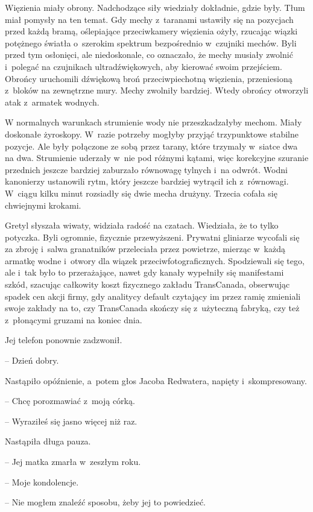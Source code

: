 \documentclass[oneside,polish,11pt,sfheadings]{mwbk}
\begin{document}
Więzienia miały obrony. Nadchodzące siły wiedziały dokładnie, gdzie
były. Tłum miał pomysły na ten temat. Gdy mechy z~taranami ustawiły się
na pozycjach przed każdą bramą, oślepiające przeciwkamery więzienia
ożyły, rzucając wiązki potężnego światła o~szerokim spektrum
bezpośrednio w~czujniki mechów. Byli przed tym osłonięci, ale
niedoskonale, co oznaczało, że mechy musiały zwolnić i~polegać na
czujnikach ultradźwiękowych, aby kierować swoim przejściem. Obrońcy
uruchomili dźwiękową broń przeciwpiechotną więzienia, przeniesioną z~bloków na zewnętrzne mury. Mechy zwolniły bardziej. Wtedy obrońcy
otworzyli atak z~armatek wodnych.

W normalnych warunkach strumienie wody nie przeszkadzałyby mechom. Miały
doskonałe żyroskopy. W~razie potrzeby mogłyby przyjąć trzypunktowe
stabilne pozycje. Ale były połączone ze sobą przez tarany, które
trzymały w~siatce dwa na dwa. Strumienie uderzały w~nie pod różnymi
kątami, więc korekcyjne szuranie przednich jeszcze bardziej zaburzało
równowagę tylnych i~na odwrót. Wodni kanonierzy ustanowili rytm, który
jeszcze bardziej wytrącił ich z~równowagi. W~ciągu kilku minut rozsiadły
się dwie mecha drużyny. Trzecia cofała się chwiejnymi krokami.

Gretyl słyszała wiwaty, widziała radość na czatach. Wiedziała, że to
tylko potyczka. Byli ogromnie, fizycznie przewyższeni. Prywatni
gliniarze wycofali się za zbroję i~salwa granatników przeleciała przez
powietrze, mierząc w~każdą armatkę wodne i~otwory dla wiązek
przeciwfotograficznych. Spodziewali się tego, ale i~tak było to
przerażające, nawet gdy kanały wypełniły się manifestami szkód, szacując
całkowity koszt fizycznego zakładu TransCanada, obserwując spadek cen
akcji firmy, gdy analitycy default czytający im przez ramię zmieniali
swoje zakłady na to, czy TransCanada skończy się z~użyteczną fabryką,
czy też z~płonącymi gruzami na koniec dnia.

Jej telefon ponownie zadzwonił.

-- Dzień dobry.

Nastąpiło opóźnienie, a~potem głos Jacoba Redwatera, napięty i~skompresowany. 

-- Chcę porozmawiać z~moją córką.

-- Wyraziłeś się jasno więcej niż raz.

Nastąpiła długa pauza. 

-- Jej matka zmarła w~zeszłym roku.

-- Moje kondolencje.

-- Nie mogłem znaleźć sposobu, żeby jej to powiedzieć.
\end{document}
